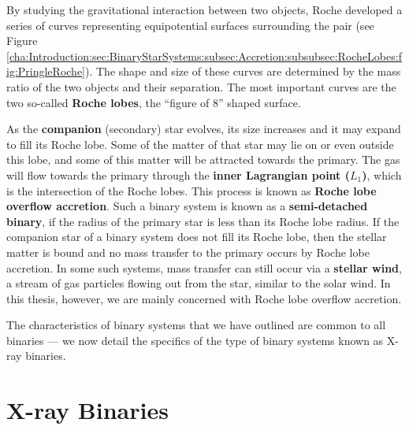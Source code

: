 By studying the gravitational interaction between two objects, Roche
developed a series of curves representing equipotential surfaces
surrounding the pair (see Figure~%
\vref{cha:Introduction:sec:BinaryStarSystems:subsec:Accretion:subsubsec:RocheLobes:fig:PringleRoche}). The shape and size of these curves are determined by the mass ratio of
the two objects and their separation.  The most important curves are
the two so-called \textbf{Roche lobes}, the ``figure of 8'' shaped surface. %

\vspace{\myparskip}

As the \textbf{companion} (secondary) star evolves, %
its size increases and it may expand to fill its Roche lobe. Some of
the matter of that star may lie on or even outside this lobe, and some of this matter will
be attracted towards the primary. The gas will flow towards the
primary through the \textbf{inner Lagrangian point ($L_1$)}, %
which is the intersection of the Roche lobes. This process is known as
\textbf{Roche lobe overflow accretion}. %
Such a binary system is known as a \textbf{semi-detached binary}, if the radius of the primary star is less than its Roche lobe
radius. If the companion star of a binary system does not fill its
Roche lobe, then the stellar matter is bound and no mass transfer to
the primary occurs by Roche lobe accretion. In some such systems, mass
transfer can still occur via a
\textbf{stellar wind}, a stream of gas particles flowing out from the star, similar to the
solar wind. In this thesis, however, we are mainly concerned with
Roche lobe overflow accretion. %

\vspace{\myparskip}

The characteristics of binary systems that we have outlined are common to all binaries --- we now detail the specifics of the type of binary systems known as X-ray binaries. %


\section{X-ray Binaries}\label{cha:Introduction:sec:X-rayBinaries}


